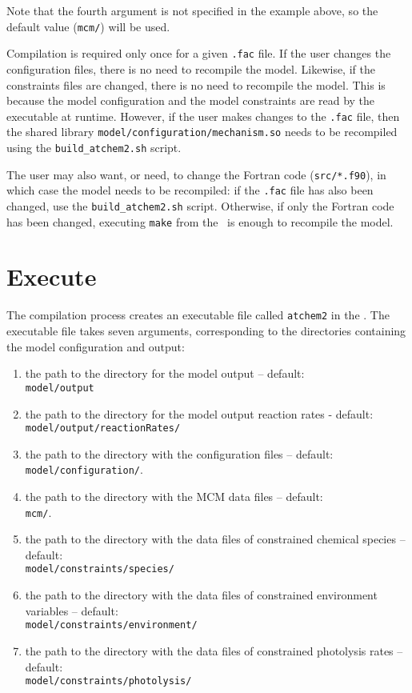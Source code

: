 Note that the fourth argument is not specified in the example above,
so the default value (\texttt{mcm/}) will be used.

Compilation is required only once for a given \texttt{.fac} file. If
the user changes the configuration files, there is no need to
recompile the model. Likewise, if the constraints files are changed,
there is no need to recompile the model. This is because the model
configuration and the model constraints are read by the executable at
runtime. However, if the user makes changes to the \texttt{.fac} file,
then the shared library \texttt{model/configuration/mechanism.so}
needs to be recompiled using the \texttt{build\_atchem2.sh} script.

The user may also want, or need, to change the Fortran code
(\texttt{src/*.f90}), in which case the model needs to be recompiled:
if the \texttt{.fac} file has also been changed, use the
\texttt{build\_atchem2.sh} script. Otherwise, if only the Fortran code
has been changed, executing \texttt{make} from the \maindir\ is enough
to recompile the model.

\section{Execute} \label{sec:execute}

The compilation process creates an executable file called
\texttt{atchem2} in the \maindir. The executable file
takes seven arguments, corresponding to the directories containing the
model configuration and output:

\begin{enumerate}
\item the path to the directory for the model output -- default:\\
  \texttt{model/output}
\item the path to the directory for the model output reaction rates -
  default:\\
  \texttt{model/output/reactionRates/}
\item the path to the directory with the configuration files --
  default:\\
  \texttt{model/configuration/}.
\item the path to the directory with the MCM data files -- default:\\
  \texttt{mcm/}.
\item the path to the directory with the data files of constrained
  chemical species -- default:\\
  \texttt{model/constraints/species/}
\item the path to the directory with the data files of constrained
  environment variables -- default:\\
  \texttt{model/constraints/environment/}
\item the path to the directory with the data files of constrained
  photolysis rates -- default:\\
  \texttt{model/constraints/photolysis/}
\end{enumerate}

